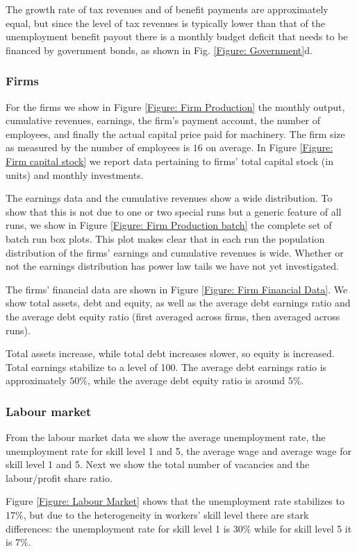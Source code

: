 The growth rate of tax revenues and of benefit payments are approximately equal, but since the level of tax revenues is typically lower than that of the unemployment benefit payout there is a monthly budget deficit that needs to be financed by government bonds, as shown in Fig. \ref{Figure: Government}d.

\subsubsection*{Firms}
For the firms we show in Figure \ref{Figure: Firm Production} the monthly output, cumulative revenues, earnings, the firm's payment account, the number of employees, and finally the actual capital price paid for machinery. The firm size as measured by the number of employees is $16$ on average. In Figure \ref{Figure: Firm capital stock} we report data pertaining to firms' total capital stock (in units) and monthly investments.

The earnings data and the cumulative revenues show a wide distribution. To show that this is not due to one or two special runs but a generic feature of all runs, we  show in Figure \ref{Figure: Firm Production batch} the complete set of batch run box plots. This plot makes clear that in each run the population distribution of the firms' earnings and cumulative revenues is wide.
Whether or not the earnings distribution has power law tails we have not yet investigated.

The firms' financial data are shown in Figure \ref{Figure: Firm Financial Data}. We show total assets, debt and equity, as well as
the average debt earnings ratio and the average debt equity ratio (first averaged across firms, then averaged across runs).

Total assets increase, while total debt increases slower, so equity is increased. Total earnings stabilize to a level of 100.
The average debt earnings ratio is approximately $50\%$, while the average debt equity ratio is around $5\%$.

\subsubsection*{Labour market}
From the labour market data we show the average unemployment rate, the unemployment rate for skill level 1 and 5, the average wage and 
average wage for skill level 1 and 5. Next we show the total number of vacancies and the labour/profit share ratio.

Figure \ref{Figure: Labour Market} shows that the unemployment rate stabilizes to $17\%$, but due to the heterogeneity in workers' skill level there are stark differences: the unemployment rate for skill level 1 is $30\%$ while for skill level  5 it is $7\%$.

